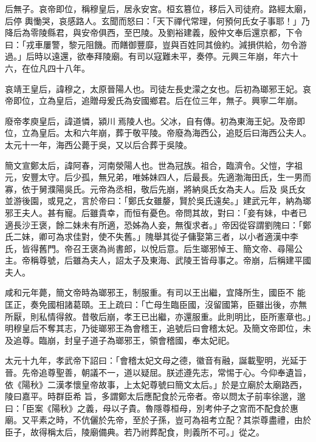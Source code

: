 \begin{pinyinscope}
 后無子。哀帝即位，稱穆皇后，居永安宮。桓玄篡位，移后入司徒府。路經太廟，后停
 輿慟哭，哀感路人。玄聞而怒曰：「天下禪代常理，何預何氏女子事耶！」乃降后為零陵縣君，與安帝俱西，至巴陵。及劉裕建義，殷仲文奉后還京都，下令曰：「戎車屢警，黎元阻饑。而饍御豐靡，豈與百姓同其儉約。減損供給，勿令游過。」后時以遠還，欲奉拜陵廟。有司以寇難未平，奏停。元興三年崩，年六十六，在位凡四十八年。



 哀靖王皇后，諱穆之，太原晉陽人也。司徒左長史濛之女也。后初為瑯邪王妃。哀帝即位，立為皇后，追贈母爰氏為安國鄉君。后在位三年，無子。興寧二年崩。



 廢帝孝庾皇后，諱道憐，潁川焉陵人也。父冰，自有傳。初為東海王妃。及帝即位，立為皇后。太和六年崩，葬于敬平陵。帝廢為海西公，追貶后曰海西公夫人。太元十一年，海西公薨于吳，又以后合葬于吳陵。



 簡文宣鄭太后，諱阿春，河南滎陽人也。世為冠族。祖合，臨濟令。父愷，字祖元，安豐太守。后少孤，無兄弟，唯姊妹四人，后最長。先適渤海田氏，生一男而寡，依于舅濮陽吳氏。元帝為丞相，敬后先崩，將納吳氏女為夫人。后及
 吳氏女並游後園，或見之，言於帝曰：「鄭氏女雖嫠，賢於吳氏遠矣。」建武元年，納為瑯邪王夫人。甚有寵。后雖貴幸，而恒有憂色。帝問其故，對曰：「妾有妹，中者已適長沙王褒，餘二妹未有所適，恐姊為人妾，無復求者。」帝因從容謂劉隗曰：「鄭氏二妹，卿可為求佳對，使不失舊。」隗舉其從子傭娶第三者，以小者適漢中李氏，皆得舊門。帝召王褒為尚書郎，以悅后意。后生瑯邪悼王、簡文帝、尋陽公主。帝稱尊號，后雖為夫人，詔太子及東海、武陵王皆母事之。帝崩，后稱建平國夫人。



 咸和元年薨，簡文帝時為瑯邪王，制服重。有司以王出繼，宜降所生，國臣不
 能匡正，奏免國相諸葛頤。王上疏曰：「亡母生臨臣國，沒留國第，臣雖出後，亦無所厭，則私情得敘。昔敬后崩，孝王已出繼，亦還服重。此則明比，臣所憲章也。」明穆皇后不奪其志，乃徙瑯邪王為會稽王，追號后曰會稽太妃。及簡文帝即位，未及追尊。臨崩，封皇子道子為瑯邪王，領會稽國，奉太妃祀。



 太元十九年，孝武帝下詔曰：「會稽太妃文母之德，徽音有融，誕載聖明，光延于晉。先帝追尊聖善，朝議不一，道以疑屈。朕述遵先志，常惕于心。今仰奉遺旨，依《陽秋》二漢孝懷皇帝故事，上太妃尊號曰簡文太后。」於是立廟於太廟路西，陵曰嘉平。時群臣希
 旨，多謂鄭太后應配食於元帝者。帝以問太子前率徐邈，邈曰：「臣案《陽秋》之義，母以子貴。魯隱尊桓母，別考仲子之宮而不配食於惠廟。又平素之時，不伉儷於先帝，至於子孫，豈可為祖考立配？其崇尊盡禮，由於臣子，故得稱太后，陵廟備典。若乃祔葬配食，則義所不可。」從之。




\end{pinyinscope}
